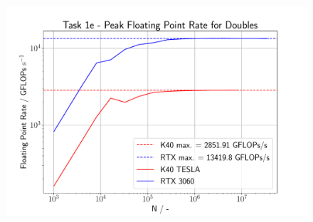 \begin{figure}[h]
  \begin{center}
    \includegraphics[width= 0.8\linewidth]{figures/task_1_e.pdf}
    \caption{}
    \label{label_1e_figure}
  \end{center}
\end{figure}

\pagebreak